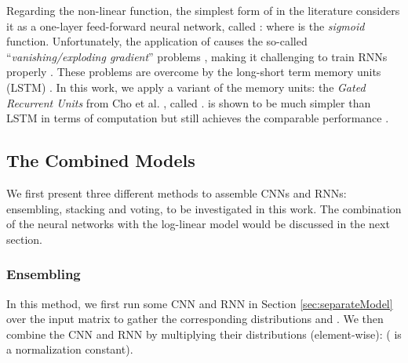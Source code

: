 \documentclass[11pt,letterpaper]{article}
\begin{document}
Regarding the non-linear function, the simplest form of  in the literature considers it as a one-layer feed-forward neural network, called :  where  is the {\it sigmoid} function. Unfortunately, the application of  causes the so-called ``{\it vanishing/exploding gradient}'' problems \cite{Bengio:94}, making it challenging to train RNNs properly \cite{Pascanu:12}. These problems are overcome by the long-short term memory units (LSTM) \cite{Hochreiter:97,Graves:09}.  In this work, we apply a variant of the memory units: the {\it Gated Recurrent Units}  from Cho et al. , called .  is shown to be much simpler than LSTM in terms of computation but still achieves the comparable performance \cite{Cho:14}.
\begin{comment}

\end{comment}

























\subsection{The Combined Models}

\label{sec:combinedModels}



We first present three different methods to assemble CNNs and RNNs: ensembling, stacking and voting, to be investigated in this work. The combination of the neural networks with the log-linear model would be discussed in the next section.

\subsubsection{Ensembling}

\label{sec:ensembling}



In this method, we first run some CNN and RNN in Section \ref{sec:separateModel} over the input matrix  to gather the corresponding distributions  and . We then combine the CNN and RNN by multiplying their distributions (element-wise):  ( is a normalization constant).
\end{document}

